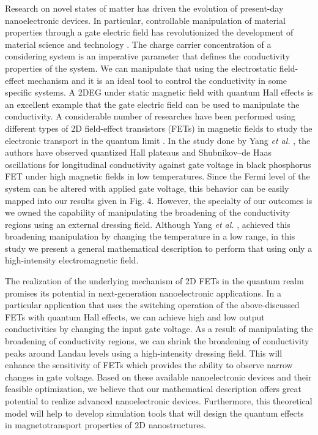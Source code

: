 \documentclass{article}
\begin{document}
\begin{itemize}
{  Research on novel states of matter has driven the evolution of present-day nanoelectronic devices. In particular, controllable manipulation of material properties through a gate electric field has revolutionized the development of material science and technology \cite{ahn03,deng18}.
  The charge carrier concentration of a considering system is an imperative parameter that defines the conductivity properties of the system. We can manipulate that using the electrostatic field-effect mechanism and it is an ideal tool to control the conductivity in some specific systems.
  A 2DEG under static magnetic field with quantum Hall effects is an excellent example that the gate electric field can be used to manipulate the conductivity. A considerable number of researches have been performed using different types of 2D field-effect transistors (FETs) in magnetic fields to study the electronic transport in the quantum limit \cite{wakabayashi78,yang18,long20,li14}. In the study done by Yang \textit{et al.} \cite{yang18}, the authors have observed quantized Hall plateaus and Shubnikov–de Haas oscillations for longitudinal conductivity against gate voltage in black phosphorus FET under high magnetic fields in low temperatures. Since the Fermi level of the system can be altered with applied gate voltage, this behavior can be easily mapped into our results given in Fig. 4. However, the specialty of our outcomes is we owned the capability of manipulating the broadening of the conductivity regions using an external dressing field. Although Yang \textit{et al.} \cite{yang18}, achieved this broadening manipulation by changing the temperature in a low range, in this study we present a general mathematical description to perform that using only a high-intensity electromagnetic field.

  The realization of the underlying mechanism of 2D FETs in the quantum realm promises its potential in next-generation nanoelectronic applications. In a particular application that uses the switching operation of the above-discussed FETs with quantum Hall effects, we can achieve high and low output conductivities by changing the input gate voltage. As a result of manipulating the broadening of conductivity regions, we can shrink the broadening of conductivity peaks around Landau levels using a high-intensity dressing field. This will enhance the sensitivity of FETs which provides the ability to observe narrow changes in gate voltage. Based on these available nanoelectronic devices and their feasible optimization, we believe that our mathematical description offers great potential to realize advanced nanoelectronic devices. Furthermore, this theoretical model will help to develop simulation tools that will design the quantum effects in magnetotransport properties of 2D nanostructures.
  }
\end{itemize}
\end{document}
